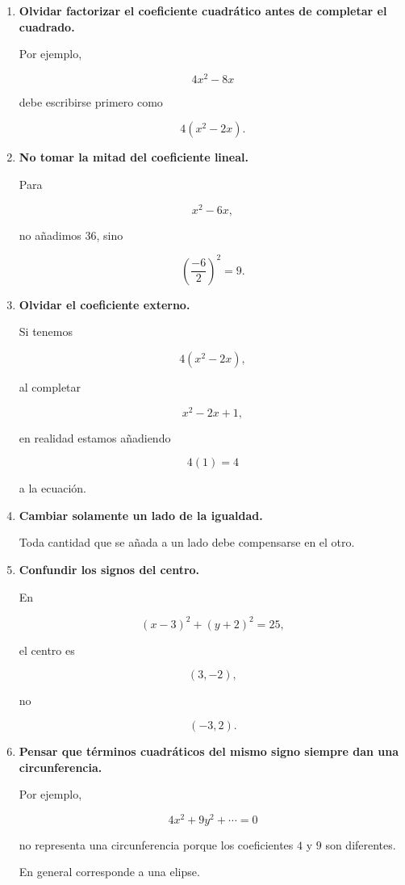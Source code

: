 \documentclass[12pt]{article}
\begin{document}
\begin{enumerate}

\item \textbf{Olvidar factorizar el coeficiente cuadrático antes de
completar el cuadrado.}

Por ejemplo,

\[
4x^2-8x
\]

debe escribirse primero como

\[
4(x^2-2x).
\]

\item \textbf{No tomar la mitad del coeficiente lineal.}

Para

\[
x^2-6x,
\]

no añadimos \(36\), sino

\[
\left(\frac{-6}{2}\right)^2=9.
\]

\item \textbf{Olvidar el coeficiente externo.}

Si tenemos

\[
4(x^2-2x),
\]

al completar

\[
x^2-2x+1,
\]

en realidad estamos añadiendo

\[
4(1)=4
\]

a la ecuación.

\item \textbf{Cambiar solamente un lado de la igualdad.}

Toda cantidad que se añada a un lado debe compensarse en el otro.

\item \textbf{Confundir los signos del centro.}

En

\[
(x-3)^2+(y+2)^2=25,
\]

el centro es

\[
(3,-2),
\]

no

\[
(-3,2).
\]

\item \textbf{Pensar que términos cuadráticos del mismo signo siempre
dan una circunferencia.}

Por ejemplo,

\[
4x^2+9y^2+\cdots=0
\]

no representa una circunferencia porque los coeficientes \(4\) y \(9\)
son diferentes.

En general corresponde a una elipse.

\end{enumerate}
\end{document}
